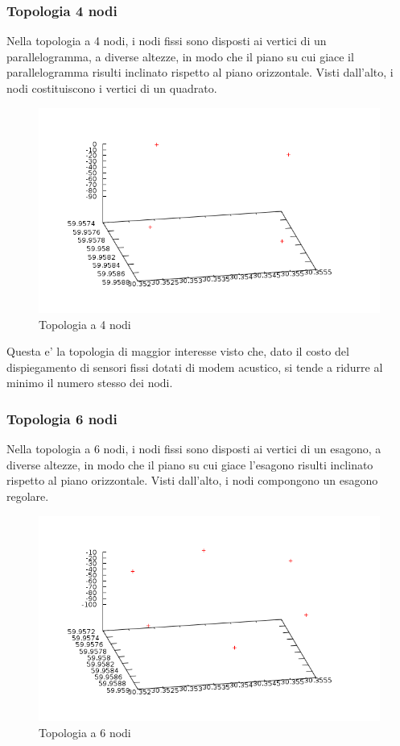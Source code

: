 \subsubsection{Topologia 4 nodi}
Nella topologia a 4 nodi, i nodi fissi sono disposti ai vertici di un parallelogramma, a diverse altezze, in modo che il piano su cui giace il parallelogramma risulti inclinato rispetto al piano orizzontale. Visti dall'alto, i nodi costituiscono i vertici di un quadrato.
\begin{figure}[H]
    \centering
    \includegraphics[width=\linewidth]{squaretopology.png}
    \caption{Topologia a 4 nodi}
    \label{fig:my_label}
\end{figure}
Questa e' la topologia di maggior interesse visto che, dato il costo del dispiegamento di sensori fissi dotati di modem acustico, si tende a ridurre al minimo il numero stesso dei nodi.

\subsubsection{Topologia 6 nodi}
Nella topologia a 6 nodi, i nodi fissi sono disposti ai vertici di un esagono, a diverse altezze, in modo che il piano su cui giace l'esagono risulti inclinato rispetto al piano orizzontale. Visti dall'alto, i nodi compongono un esagono regolare.  
\begin{figure}[H]
    \centering
    \includegraphics[width=\linewidth]{topologyhexagon.png}
    \caption{Topologia a 6 nodi}
    \label{fig:my_label}
\end{figure}
